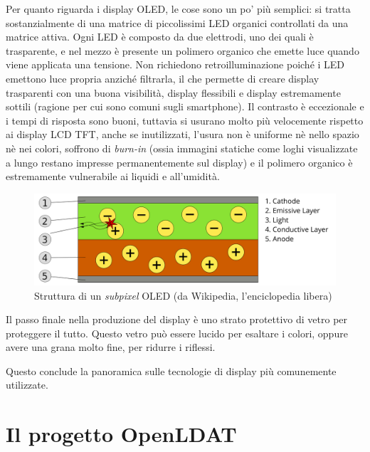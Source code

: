 Per quanto riguarda i display OLED, le cose sono un po' più semplici: si tratta sostanzialmente di una matrice di piccolissimi LED organici controllati da una matrice attiva\cite{amoled1}. Ogni LED è composto da due elettrodi, uno dei quali è trasparente, e nel mezzo è presente un polimero organico che emette luce quando viene applicata una tensione. Non richiedono retroilluminazione poiché i LED emettono luce propria anziché filtrarla, il che permette di creare display trasparenti con una buona visibilità, display flessibili\cite{flexibleoleds} e display estremamente sottili (ragione per cui sono comuni sugli smartphone). Il contrasto è eccezionale e i tempi di risposta sono buoni, tuttavia si usurano molto più velocemente rispetto ai display LCD TFT, anche se inutilizzati, l'usura non è uniforme nè nello spazio nè nei colori, soffrono di \textit{burn-in} (ossia immagini statiche come loghi visualizzate a lungo restano impresse permanentemente sul display) e il polimero organico è estremamente vulnerabile ai liquidi e all'umidità.

\begin{figure}[h]
	\centering
	\includegraphics[width=\textwidth]{Introduzione_files/oled.png}
	\caption{Struttura di un \textit{subpixel} OLED (da Wikipedia, l'enciclopedia libera)}
	\label{fig:oled}
\end{figure}

Il passo finale nella produzione del display è uno strato protettivo di vetro per proteggere il tutto. Questo vetro può essere lucido per esaltare i colori, oppure avere una grana molto fine, per ridurre i riflessi.

Questo conclude la panoramica sulle tecnologie di display più comunemente utilizzate.

\section{Il progetto OpenLDAT}
